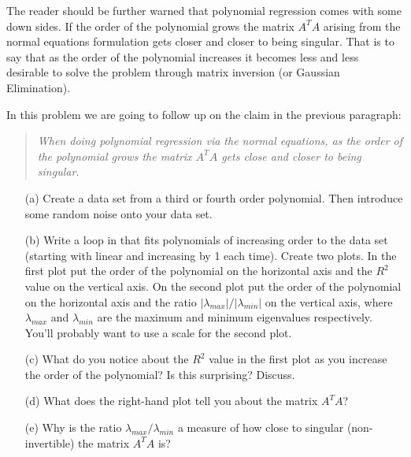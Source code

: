 The reader should be further warned that polynomial regression comes with some down sides.
If the order of the polynomial grows the matrix $A^TA$ arising from the normal equations
formulation gets closer and closer to being singular.  That is to say that as the order of
the polynomial increases it becomes less and less desirable to solve the problem through
matrix inversion (or Gaussian Elimination).  

\begin{problem}
    In this problem we are going to follow up on the claim in the previous paragraph:
    \begin{quote}
        {\it When doing polynomial regression via the normal equations, as the order of
            the polynomial grows the matrix $A^T A$ gets close and closer to being
        singular.}
    \end{quote}
    \begin{enumerate}
        \item[(a)] Create a data set from a third or fourth order polynomial.  Then
            introduce some random noise onto your data set.  
        \item[(b)] Write a loop in \ProgLang that fits polynomials of increasing order to
            the data set (starting with linear and increasing by 1 each time).  Create two
            plots.  In the first plot put the order of the polynomial on the horizontal
            axis and the $R^2$ value on the vertical axis.  On the second plot put the
            order of the polynomial on the horizontal axis and the ratio $\left|
            \lambda_{max} \right| / \left| \lambda_{min} \right|$ on the vertical axis,
            where $\lambda_{max}$ and $\lambda_{min}$ are the maximum and minimum
            eigenvalues respectively.  You'll probably want to use a 
            scale for the second plot.  
        \item[(c)] What do you notice about the $R^2$ value in the first plot as you
            increase the order of the polynomial?  Is this surprising?  Discuss.
        \item[(d)] What does the right-hand plot tell you about the matrix $A^T A$?
        \item[(e)] Why is the ratio $\lambda_{max}/\lambda_{min}$ a measure of how close
            to singular (non-invertible) the matrix $A^T A$ is? 
    \end{enumerate}
\end{problem}

